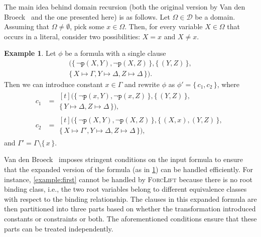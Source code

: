 \documentclass{article}
\theoremstyle{definition}
\newtheorem{example}{Example}
\theoremstyle{remark}
\begin{document}
The main idea behind domain recursion (both the original version by Van den
Broeck~ and the one presented here) is as
follows. Let $\Omega \in \mathcal{D}$ be a domain. Assuming that
$\Omega \ne \emptyset$, pick some $x \in \Omega$. Then, for every variable
$X \in \Omega$ that occurs in a literal, consider two possibilities: $X = x$ and
$X \ne x$.

\begin{example}\label{example:dr}
  Let $\phi$ be a formula with a single clause
  \begin{multline*}
    (\{\, \neg \texttt{p}(X, Y), \neg \texttt{p}(X, Z) \,\}, \{\, (Y, Z) \,\}, \\
    \{\, X \mapsto \Gamma, Y \mapsto \Delta, Z \mapsto \Delta \,\}).
  \end{multline*}
  Then we can introduce constant $x \in \Gamma$ and rewrite $\phi$ as
  $\phi' = \{\, c_{1}, c_{2} \,\}$, where
  \begin{align*}
    c_{1} &= \begin{multlined}[t]
      (\{\, \neg \texttt{p}(x, Y), \neg \texttt{p}(x, Z) \,\}, \{\, (Y, Z) \,\}, \\
      \{\, Y \mapsto \Delta, Z \mapsto \Delta \,\}),
      \end{multlined}\\
    c_{2} &= \begin{multlined}[t]
      (\{\, \neg \texttt{p}(X, Y), \neg \texttt{p}(X, Z) \,\}, \{\, (X, x), (Y, Z) \,\}, \\
      \{\, X \mapsto \Gamma', Y \mapsto \Delta, Z \mapsto \Delta \,\}),
      \end{multlined}
  \end{align*}
  and $\Gamma' = \Gamma \setminus \{\, x \,\}$.
\end{example}

Van den Broeck~ imposes stringent conditions
on the input formula to ensure that the expanded version of the formula (as in
\cref{example:dr}) can be handled efficiently. For instance,
\cref{example:first} cannot be handled by \textsc{ForcLift} because there is no
root binding class, i.e., the two root variables belong to different equivalence
classes with respect to the binding relationship. The clauses in this expanded
formula are then partitioned into three parts based on whether the
transformation introduced constants or constraints or both. The aforementioned
conditions ensure that these parts can be treated independently.
\end{document}

